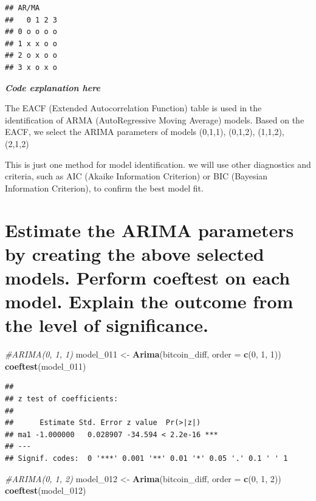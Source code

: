 \documentclass[
]{book}
\newenvironment{Shaded}{\begin{snugshade}}{\end{snugshade}}
\newcommand{\AttributeTok}[1]{\textcolor[rgb]{0.13,0.29,0.53}{#1}}
\newcommand{\CommentTok}[1]{\textcolor[rgb]{0.56,0.35,0.01}{\textit{#1}}}
\newcommand{\DecValTok}[1]{\textcolor[rgb]{0.00,0.00,0.81}{#1}}
\newcommand{\FunctionTok}[1]{\textcolor[rgb]{0.13,0.29,0.53}{\textbf{#1}}}
\newcommand{\NormalTok}[1]{#1}
\newcommand{\OtherTok}[1]{\textcolor[rgb]{0.56,0.35,0.01}{#1}}
\begin{document}
\begin{verbatim}
## AR/MA
##   0 1 2 3
## 0 o o o o
## 1 x x o o
## 2 o x o o
## 3 x o x o
\end{verbatim}

\emph{\textbf{Code explanation here}}

The EACF (Extended Autocorrelation Function) table is used in the identification of ARMA (AutoRegressive Moving Average) models.
Based on the EACF, we select the ARIMA parameters of models (0,1,1), (0,1,2), (1,1,2), (2,1,2)

This is just one method for model identification.
we will use other diagnostics and criteria, such as AIC (Akaike Information Criterion) or BIC (Bayesian Information Criterion), to confirm the best model fit.

\section{Estimate the ARIMA parameters by creating the above selected models. Perform coeftest on each model. Explain the outcome from the level of significance.}\label{estimate-the-arima-parameters-by-creating-the-above-selected-models.-perform-coeftest-on-each-model.-explain-the-outcome-from-the-level-of-significance.}

\begin{Shaded}
\begin{Highlighting}[]
\CommentTok{\#ARIMA(0, 1, 1)}
\NormalTok{model\_011 }\OtherTok{\textless{}{-}} \FunctionTok{Arima}\NormalTok{(bitcoin\_diff, }\AttributeTok{order =} \FunctionTok{c}\NormalTok{(}\DecValTok{0}\NormalTok{, }\DecValTok{1}\NormalTok{, }\DecValTok{1}\NormalTok{))}
\FunctionTok{coeftest}\NormalTok{(model\_011)}
\end{Highlighting}
\end{Shaded}

\begin{verbatim}
## 
## z test of coefficients:
## 
##      Estimate Std. Error z value  Pr(>|z|)    
## ma1 -1.000000   0.028907 -34.594 < 2.2e-16 ***
## ---
## Signif. codes:  0 '***' 0.001 '**' 0.01 '*' 0.05 '.' 0.1 ' ' 1
\end{verbatim}

\begin{Shaded}
\begin{Highlighting}[]
\CommentTok{\#ARIMA(0, 1, 2)}
\NormalTok{model\_012 }\OtherTok{\textless{}{-}} \FunctionTok{Arima}\NormalTok{(bitcoin\_diff, }\AttributeTok{order =} \FunctionTok{c}\NormalTok{(}\DecValTok{0}\NormalTok{, }\DecValTok{1}\NormalTok{, }\DecValTok{2}\NormalTok{))}
\FunctionTok{coeftest}\NormalTok{(model\_012)}
\end{Highlighting}
\end{Shaded}
\end{document}
